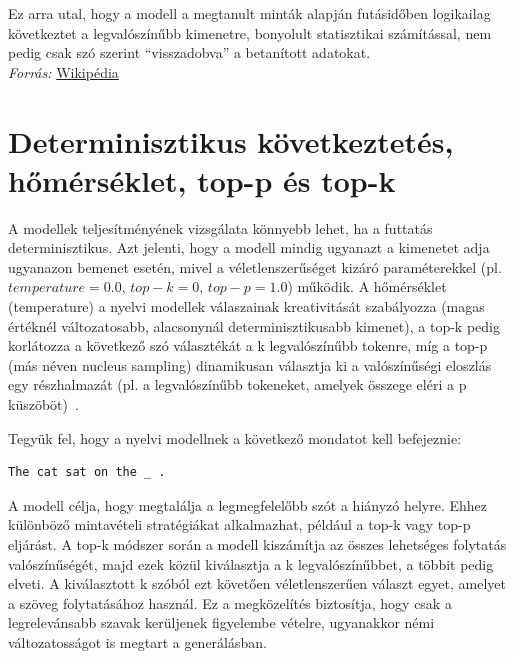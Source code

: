\documentclass[12pt]{report}
\begin{document}
    Ez arra utal, hogy a modell a megtanult minták alapján futásidőben logikailag következtet a legvalószínűbb kimenetre, bonyolult statisztikai számítással, nem pedig csak szó szerint ``visszadobva'' a betanított adatokat.\\
    \textit{ Forrás:} \href{https://hu.wikipedia.org/wiki/Nagy_nyelvi_modell}{Wikipédia}


    \section{Determinisztikus következtetés, hőmérséklet, top-p és top-k}
    A modellek teljesítményének vizsgálata könnyebb lehet, ha a futtatás determinisztikus.
    Azt jelenti, hogy a modell mindig ugyanazt a kimenetet adja ugyanazon bemenet esetén, mivel a véletlenszerűséget kizáró paraméterekkel (pl. $temperature=0.0$, $top-k=0$, $top-p=1.0$) működik.
    A hőmérséklet (temperature) a nyelvi modellek válaszainak kreativitását szabályozza (magas értéknél változatosabb, alacsonynál determinisztikusabb kimenet), a top-k pedig korlátozza a következő szó választékát a k legvalószínűbb tokenre, míg a top-p (más néven nucleus sampling) dinamikusan választja ki a valószínűségi eloszlás egy részhalmazát (pl. a legvalószínűbb tokeneket, amelyek összege eléri a p küszöböt)~\cite{holtzman2020curious}.

    Tegyük fel, hogy a nyelvi modellnek a következő mondatot kell befejeznie:

    \begin{verbatim}
The cat sat on the _ .
    \end{verbatim}
    A modell célja, hogy megtalálja a legmegfelelőbb szót a hiányzó helyre.
    Ehhez különböző mintavételi stratégiákat alkalmazhat, például a top-k vagy top-p eljárást.
    A top-k módszer során a modell kiszámítja az összes lehetséges folytatás valószínűségét, majd ezek közül kiválasztja a k legvalószínűbbet, a többit pedig elveti.
    A kiválasztott k szóból ezt követően véletlenszerűen választ egyet, amelyet a szöveg folytatásához használ.
    Ez a megközelítés biztosítja, hogy csak a legrelevánsabb szavak kerüljenek figyelembe vételre, ugyanakkor némi változatosságot is megtart a generálásban.
\end{document}
